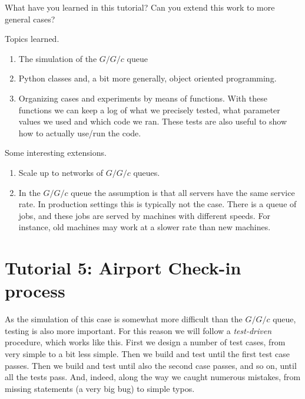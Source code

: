 \begin{exercise}
  What have you learned in this tutorial?
 Can you extend this work to more general cases? 
  \begin{solution}
    Topics learned.
    \begin{enumerate}
    \item The simulation of the $G/G/c$ queue
    \item Python classes and, a bit more generally, object oriented programming. 
    \item Organizing cases and experiments by means of  functions. With these functions we can keep a log of what we precisely tested, what parameter values we used and which code we ran. These tests are also useful to show how to actually use/run the code.
    \end{enumerate}

Some  interesting extensions.
    \begin{enumerate}
    \item   Scale up to networks of $G/G/c$ queues.
    \item In the $G/G/c$ queue the assumption is that all servers have the same service rate.
      In production settings this is typically not the case.
      There is a queue of jobs, and these jobs are served by machines with different speeds.
      For instance, old machines may work at a slower rate than new machines.
    \end{enumerate}
  \end{solution}
\end{exercise}


\clearpage


\section{Tutorial 5: Airport Check-in process}
\label{sec:simul-check-proc}

As the simulation of this case is somewhat more difficult than the $G/G/c$ queue, testing is also more important.
For this reason we will follow a \emph{test-driven} procedure, which works like this.
First we design a number of test cases, from very simple to a bit less simple.
Then we  build and test until the first test case passes.
Then we build and test until also the second case passes, and so on, until all the tests pass.
And, indeed, along the way we caught numerous mistakes, from missing  statements (a very big bug) to simple typos.

